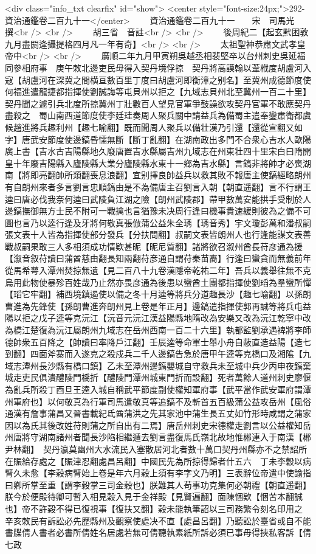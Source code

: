 <div class="info_txt clearfix" id="show">
<center style="font-size:24px;">292-資治通鑑卷二百九十一</center>
  　　資治通鑑卷二百九十一　　宋　司馬光　撰<br />
<br />
　　胡三省　音註<br />
<br />
　　後周紀二【起玄黓困敦九月盡閼逢攝提格四月凡一年有奇】<br />
<br />
　　太祖聖神恭肅文武孝皇帝中<br />
<br />
　　廣順二年九月甲寅朔吳越丞相裴堅卒以台州刺史吳延福同參相府事　庚午敇北邊吏民毋得入契丹境俘掠　契丹將高謨翰以葦栰度胡盧河入寇【胡盧河在深冀之間横亘數百里丁度曰胡盧河即衡漳之别名】至冀州成德節度使何福進遣龍捷都指揮使劉誠誨等屯貝州以拒之【九域志貝州北至冀州一百二十里】契丹聞之遽引兵北度所掠冀州丁壯數百人望見官軍爭鼓譟欲攻契丹官軍不敢應契丹盡殺之　蜀山南西道節度使李廷珪奏周人聚兵關中請益兵為備蜀主遣奉鑾肅衛都虞候趙進將兵趣利州【趣七喻翻】既而聞周人聚兵以備壮漢乃引還【還從宣翻又如字】唐武安節度使邊鎬昏懦無斷【斷丁亂翻】在湖南政出多門不合衆心吉水人歐陽廣上書【吉水古吉陽縣地久廢唐置吉水縣屬吉州九域志在州東壮四十里宋白曰隋開皇十年廢吉陽縣入廬陵縣大業分廬陵縣水東十一鄉為吉水縣】言鎬非將帥才必喪湖南【將即亮翻帥所類翻喪息浪翻】宜别擇良帥益兵以救其敗不報唐主使鎬經略朗州有自朗州來者多言劉言忠順鎬由是不為備唐主召劉言入朝【朝直遥翻】言不行謂王逵曰唐必伐我奈何逵曰武陵負江湖之險【朗州武陵郡】帶甲數萬安能拱手受制於人邊鎬撫御無方士民不附可一戰擒也言猶豫未决周行逢曰機事貴速緩則彼為之備不可圖也言乃以逵行逢及牙將何敬真張倣蒲公益朱全琇【琇音秀】宇文瓊彭萬和潘叔嗣張文表十人皆為指揮使部分發兵【分扶問翻】叔嗣文表皆朗州人也行逢能謀文表善戰叔嗣果敢三人多相須成功情欵甚昵【昵尼質翻】諸將欲召溆州酋長苻彦通為援【溆音叙苻讀曰蒲酋慈由翻長知兩翻苻彦通自謂苻秦苗裔】行逢曰蠻貪而無義前年從馬希萼入潭州焚掠無遺【見二百八十九卷漢隱帝乾祐二年】吾兵以義舉往無不克烏用此物使暴殄百姓哉乃止然亦畏彦通為後患以蠻酋土團都指揮使劉瑫為羣蠻所憚【瑫它牢翻】補西境鎮遏使以備之冬十月逵等將兵分道趣長沙【趣七喻翻】以孫朗曹進為先鋒使【孫朗曹進奔朗州見上卷是年正月】邊鎬遣指揮使郭再誠等將兵屯益陽以拒之戊子逵等克沅江【沅音元沅江漢益陽縣地隋改為安樂又改為沅江乾寧中改為橋江楚復為沅江屬朗州九域志在岳州西南一百二十六里】執都監劉承遇禆將李師德帥衆五百降之【帥讀曰率降戶江翻】壬辰逵等命軍士舉小舟自蔽直造益陽【造七到翻】四面斧寨而入遂克之殺戍兵二千人邊鎬告急於唐甲午逵等克橋口及湘隂【九域志潭州長沙縣有橋口鎮】乙未至潭州邊鎬嬰城自守救兵未至城中兵少丙申夜鎬棄城走吏民俱潰醴陵門橋折【醴陵門潭州城東門折而設翻】死者萬餘人道州刺史廖偃為亂兵所殺丁酉旦王逵入城自稱武平節度副使權知軍府事【武平當作武安軍府謂潭州軍府也】以何敬真為行軍司馬遣敬真等追鎬不及斬首五百級蒲公益攻岳州【風俗通漢有詹事蒲昌又晉書載紀氐酋蒲洪之先其家池中蒲生長五丈如竹形時咸謂之蒲家因以為氏其後改姓苻則蒲之所自出有二焉】唐岳州刺史宋德權走劉言以公益權知岳州唐將守湖南諸州者聞長沙陷相繼遁去劉言盡復馬氏嶺北故地惟郴連入于南漢【郴尹林翻】　契丹瀛莫幽州大水流民入塞散居河北者數十萬口契丹州縣亦不之禁詔所在賑給存處之【賑津忍翻處昌呂翻】中國民先為所掠得歸者什五六　丁未李穀以病臂久未愈【李穀病臂始上卷是年六月穀上須有李字文乃明】三表辭位帝遣中使諭指曰卿所掌至重【謂李穀掌三司金穀也】朕難其人苟事功克集何必朝禮【朝直遥翻】朕今於便殿待卿可暫入相見穀入見于金祥殿【見賢遍翻】面陳悃欵【悃苦本翻誠也】帝不許穀不得已復視事【復扶又翻】穀未能執筆詔以三司務繁令刻名印用之　辛亥敇民有訴訟必先歷縣州及觀察使處决不直【處昌呂翻】乃聽訟於臺省或自不能書牒倩人書者必書所倩姓名居處若無可倩聽執素紙所訴必須已事毋得挾私客訴【倩七政